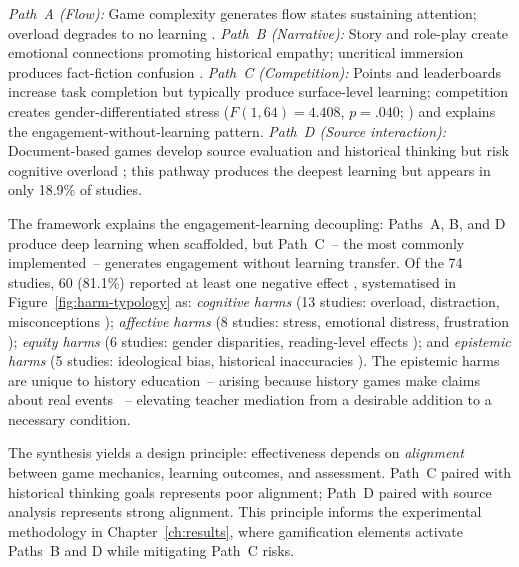 

\textit{Path~A (Flow):} Game complexity generates flow states sustaining attention; overload degrades to no learning \cite{16Chen201447, 63Liu2021, 64Hsu201324, 70Hou201519, 48Moketar2021, 45Yu2015727}. \textit{Path~B (Narrative):} Story and role-play create emotional connections promoting historical empathy; uncritical immersion produces fact-fiction confusion \cite{71lynch2015pedagogical, 61Karsenti202027, 12Gilbert2019108}. \textit{Path~C (Competition):} Points and leaderboards increase task completion but typically produce surface-level learning; competition creates gender-differentiated stress ($F(1,64) = 4.408$, $p = .040$; \citealt{8Yu2014}) and explains the engagement-without-learning pattern. \textit{Path~D (Source interaction):} Document-based games develop source evaluation and historical thinking but risk cognitive overload \cite{52Lin2011265, 54Gibson2007, 41Petersen2023301}; this pathway produces the deepest learning but appears in only 18.9\% of studies.

The framework explains the engagement-learning decoupling: Paths~A, B, and D produce deep learning when scaffolded, but Path~C~-- the most commonly implemented~-- generates engagement without learning transfer. Of the 74 studies, 60 (81.1\%) reported at least one negative effect \cite{KorniienkoSemerikov2024}, systematised in Figure~\ref{fig:harm-typology} as: \textit{cognitive harms} (13 studies: overload, distraction, misconceptions \cite{52Lin2011265, 54Gibson2007, 71lynch2015pedagogical, 61Karsenti202027}); \textit{affective harms} (8 studies: stress, emotional distress, frustration \cite{34Serrano2023, 78Rouse2022357, 55Squire2004}); \textit{equity harms} (6 studies: gender disparities, reading-level effects \cite{8Yu2014, 15Slater2022}); and \textit{epistemic harms} (5 studies: ideological bias, historical inaccuracies \cite{46Stirling2022, 61Karsenti202027}). The epistemic harms are unique to history education~-- arising because history games make claims about real events \cite{DichevDicheva2017, Connolly2012}~-- elevating teacher mediation from a desirable addition to a necessary condition.



The synthesis yields a design principle: effectiveness depends on \textit{alignment} between game mechanics, learning outcomes, and assessment. Path~C paired with historical thinking goals represents poor alignment; Path~D paired with source analysis represents strong alignment. This principle informs the experimental methodology in Chapter~\ref{ch:results}, where gamification elements activate Paths~B and D while mitigating Path~C risks.


